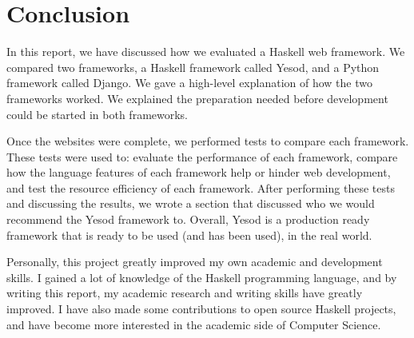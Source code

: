 \chapter{Conclusion}

In this report, we have discussed how we evaluated a
Haskell web framework. We compared two frameworks,
a Haskell framework called Yesod, and a Python
framework called Django. We gave a high-level explanation
of how the two frameworks worked. We explained the preparation
needed before development could be started in both frameworks.

Once the websites were complete, we performed tests to compare
each framework. These tests were used to: evaluate the performance
of each framework, compare how the language features
of each framework help or hinder web development, and test
the resource efficiency of each framework. After performing
these tests and discussing the results, we wrote a section
that discussed who we would recommend the Yesod framework
to. Overall, Yesod is a production ready framework that is
ready to be used (and has been used), in the real world.

Personally, this project greatly improved my own academic and
development skills. I gained a lot of knowledge of the Haskell
programming language, and by writing this report, my academic
research and writing skills have greatly improved. I have also
made some contributions to open source Haskell projects, and
have become more interested in the academic side of Computer
Science.
